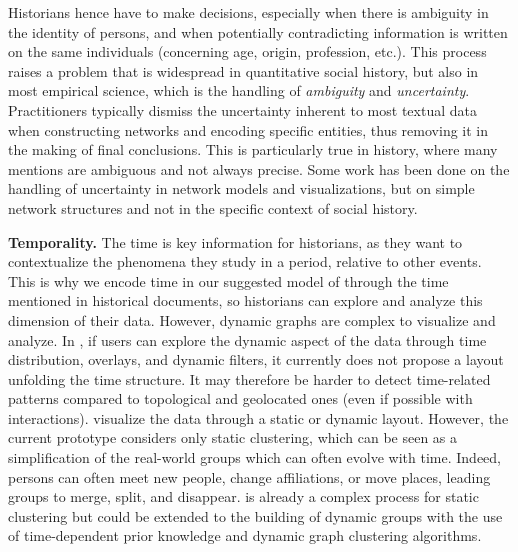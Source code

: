 
Historians hence have to make decisions, especially when there is ambiguity in the identity of persons, and when potentially contradicting information is written on the same individuals (concerning age, origin, profession, etc.).
This process raises a problem that is widespread in quantitative social history, but also in most empirical science, which is the handling of \emph{ambiguity} and \emph{uncertainty}.
Practitioners typically dismiss the uncertainty inherent to most textual data when constructing networks and encoding specific entities, thus removing it in the making of final conclusions.
This is particularly true in history, where many mentions are ambiguous and not always precise\cite{dufournaudRechercheEmpiriqueHistoire2015}.
Some work has been done on the handling of uncertainty in network models\cite{adarManagingUncertaintySocial2007} and visualizations\cite{schulzProbabilisticGraphLayout2017}, but on simple network structures and not in the specific context of social history.


\noindent\textbf{Temporality.} The time is key information for historians, as they want to contextualize the phenomena they study in a period, relative to other events.
This is why we encode time in our suggested model of \modelplural through the time mentioned in historical documents, so historians can explore and analyze this dimension of their data.
However, dynamic graphs are complex to visualize and analyze.
In \combinet, if users can explore the dynamic aspect of the data through time distribution, overlays, and dynamic filters, it currently does not propose a layout unfolding the time structure.
It may therefore be harder to detect time-related patterns compared to topological and geolocated ones (even if possible with interactions).
\pkclustering visualize the data through a static or dynamic layout.
However, the current prototype considers only static clustering, which can be seen as a simplification of the real-world groups which can often evolve with time\cite{rossettiCommunityDiscoveryDynamic2018}.
Indeed, persons can often meet new people, change affiliations, or move places, leading groups to merge, split, and disappear.
\pkclustering is already a complex process for static clustering but could be extended to the building of dynamic groups with the use of time-dependent prior knowledge and dynamic graph clustering algorithms.

